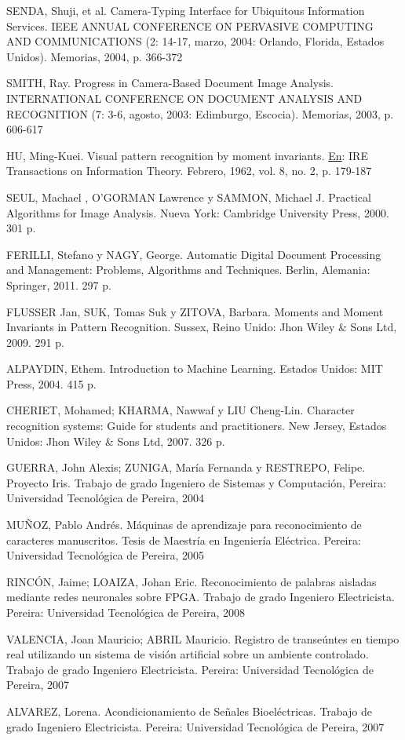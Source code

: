 \documentclass[a4paper, 11pt, oneside]{report}
\begin{document}
	SENDA, Shuji, et al. Camera-Typing Interface for Ubiquitous Information Services. IEEE ANNUAL CONFERENCE ON PERVASIVE COMPUTING AND COMMUNICATIONS (2: 14-17, marzo, 2004: Orlando, Florida, Estados Unidos). Memorias, 2004, p. 366-372
	
	SMITH, Ray. Progress in Camera-Based Document Image Analysis. INTERNATIONAL CONFERENCE ON DOCUMENT ANALYSIS AND RECOGNITION (7: 3-6, agosto, 2003: Edimburgo, Escocia). Memorias, 2003, p. 606-617
	
	HU, Ming-Kuei. Visual pattern recognition by moment invariants. \underline{En}: IRE Transactions on Information Theory. Febrero, 1962, vol. 8, no. 2, p. 179-187
	
	SEUL, Machael , O'GORMAN Lawrence y SAMMON, Michael J. Practical Algorithms for Image Analysis. Nueva York: Cambridge University Press, 2000. 301 p.
	
	FERILLI, Stefano y NAGY, George. Automatic Digital Document Processing and Management: Problems, Algorithms and Techniques. Berlin, Alemania: Springer, 2011. 297 p.
	
	FLUSSER Jan, SUK, Tomas Suk y ZITOVA, Barbara. Moments and Moment Invariants in Pattern Recognition. Sussex, Reino Unido: Jhon Wiley \& Sons Ltd, 2009. 291 p.
	
	ALPAYDIN, Ethem. Introduction to Machine Learning. Estados Unidos: MIT Press, 2004. 415 p.
	
	CHERIET, Mohamed; KHARMA, Nawwaf y LIU Cheng-Lin. Character recognition systems: Guide for students and practitioners. New Jersey, Estados Unidos: Jhon Wiley \& Sons Ltd, 2007. 326 p.
	
	GUERRA, John Alexis; ZUNIGA, María Fernanda y RESTREPO, Felipe. Proyecto Iris. Trabajo de grado Ingeniero de Sistemas y Computación, Pereira: Universidad Tecnológica de Pereira, 2004
	
	MUÑOZ, Pablo Andrés. Máquinas de aprendizaje para reconocimiento de caracteres manuscritos. Tesis de Maestría en Ingeniería Eléctrica. Pereira: Universidad Tecnológica de Pereira, 2005
	
	RINCÓN, Jaime; LOAIZA, Johan Eric. Reconocimiento de palabras aisladas mediante redes neuronales sobre FPGA. Trabajo de grado Ingeniero Electricista. Pereira: Universidad Tecnológica de Pereira, 2008
	
	VALENCIA, Joan Mauricio; ABRIL Mauricio. Registro de transeúntes en tiempo real utilizando un sistema de visión artificial sobre un ambiente controlado. Trabajo de grado Ingeniero Electricista. Pereira: Universidad Tecnológica de Pereira, 2007
	
	ALVAREZ, Lorena. Acondicionamiento de Señales Bioeléctricas. Trabajo de grado Ingeniero Electricista. Pereira: Universidad Tecnológica de Pereira, 2007
	
\end{document}
